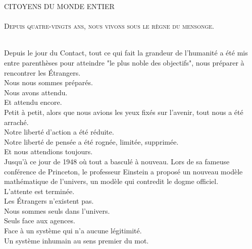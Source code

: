 \documentclass[11pt,twoside,a4paper]{article}
\begin{document}
\pagecolor{lightgray}

\begin{center}
{\Huge CITOYENS DU MONDE ENTIER}~\\~\\
{\large \textsc{Depuis quatre-vingts ans, nous vivons sous le r{\`e}gne du mensonge. }}~\\~\\
\end{center}

\begin{multicols}{2}

\setlength{\parindent}{0pt} %

Depuis le jour du Contact, tout ce qui fait la grandeur de l'humanit{\'e} a {\'e}t{\'e} mis entre parenth{\`e}ses pour atteindre "le plus noble des objectifs", nous pr{\'e}parer {\`a} rencontrer les {\'E}trangers. ~\\

Nous nous sommes pr{\'e}par{\'e}s. ~\\
Nous avons attendu. ~\\
Et attendu encore. ~\\

Petit {\`a} petit, alors que nous avions les yeux fix{\'e}s sur l'avenir, tout nous a {\'e}t{\'e} arrach{\'e}. ~\\ 
Notre libert{\'e} d'action a {\'e}t{\'e} r{\'e}duite. ~\\
Notre libert{\'e} de pens{\'e}e a {\'e}t{\'e} rogn{\'e}e, limit{\'e}e, supprim{\'e}e. ~\\ %

Et nous attendions toujours. ~\\

Jusqu'{\`a} ce jour de 1948 o{\`u} tout a bascul{\'e} {\`a} nouveau. Lors de sa fameuse conf{\'e}rence de Princeton, le professeur Einstein a propos{\'e} un nouveau mod{\`e}le math{\'e}matique de l'univers, un mod{\`e}le qui contredit le dogme officiel. ~\\ 

L'attente est termin{\'e}e. ~\\

Les {\'E}trangers n'existent pas. ~\\
Nous sommes seuls dans l'univers. ~\\
Seuls face aux agences. ~\\
Face {\`a} un syst{\`e}me qui n'a aucune l{\'e}gitimit{\'e}. ~\\ 
Un syst{\`e}me inhumain au sens premier du mot. ~\\


\end{multicols}
\end{document}
